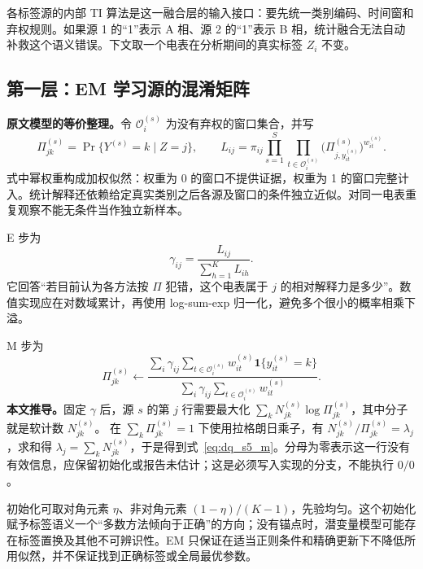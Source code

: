 \documentclass[UTF8,11pt,fontset=fandol,openany,oneside]{ctexbook}
\theoremstyle{definition}
\theoremstyle{remark}
\numberwithin{equation}{chapter}
\begin{document}
各标签源的内部 TI 算法是这一融合层的输入接口：要先统一类别编码、时间窗和弃权规则。如果源 1 的“1”表示 A 相、源 2 的“1”表示 B 相，统计融合无法自动补救这个语义错误。下文取一个电表在分析期间的真实标签 $Z_i$ 不变。

\subsection{第一层：EM 学习源的混淆矩阵}

\textbf{原文模型的等价整理。}令 $\mathcal O_i^{(s)}$ 为没有弃权的窗口集合，并写
\begin{equation}
 \Pi_{jk}^{(s)}=\Pr\{Y^{(s)}=k\mid Z=j\},\qquad
 L_{ij}=\pi_{ij}\prod_{s=1}^S\prod_{t\in\mathcal O_i^{(s)}}
       \bigl(\Pi_{j,y_{it}^{(s)}}^{(s)}\bigr)^{w_{it}^{(s)}}.
 \label{eq:dq_s5_likelihood}
\end{equation}
式中幂权重构成加权似然：权重为 0 的窗口不提供证据，权重为 1 的窗口完整计入。统计解释还依赖给定真实类别之后各源及窗口的条件独立近似。对同一电表重复观察不能无条件当作独立新样本。

E 步为
\begin{equation}
 \gamma_{ij}=\frac{L_{ij}}{\sum_{h=1}^K L_{ih}}.
 \label{eq:dq_s5_e}
\end{equation}
它回答“若目前认为各方法按 $\Pi$ 犯错，这个电表属于 $j$ 的相对解释力是多少”。数值实现应在对数域累计，再使用 log-sum-exp 归一化，避免多个很小的概率相乘下溢。

M 步为
\begin{equation}
 \Pi_{jk}^{(s)}\leftarrow
 \frac{\displaystyle\sum_i\gamma_{ij}
       \sum_{t\in\mathcal O_i^{(s)}}w_{it}^{(s)}\mathbf1\{y_{it}^{(s)}=k\}}
      {\displaystyle\sum_i\gamma_{ij}
       \sum_{t\in\mathcal O_i^{(s)}}w_{it}^{(s)}}.
 \label{eq:dq_s5_m}
\end{equation}
\textbf{本文推导。}固定 $\gamma$ 后，源 $s$ 的第 $j$ 行需要最大化
$\sum_k N_{jk}^{(s)}\log\Pi_{jk}^{(s)}$，其中分子就是软计数 $N_{jk}^{(s)}$。
在 $\sum_k\Pi_{jk}^{(s)}=1$ 下使用拉格朗日乘子，有
$N_{jk}^{(s)}/\Pi_{jk}^{(s)}=\lambda_j$，求和得 $\lambda_j=\sum_kN_{jk}^{(s)}$，于是得到式~\eqref{eq:dq_s5_m}。分母为零表示这一行没有有效信息，应保留初始化或报告未估计；这是必须写入实现的分支，不能执行 $0/0$。

初始化可取对角元素 $\eta$、非对角元素 $(1-\eta)/(K-1)$，先验均匀。这个初始化赋予标签语义一个“多数方法倾向于正确”的方向；没有锚点时，潜变量模型可能存在标签置换及其他不可辨识性。EM 只保证在适当正则条件和精确更新下不降低所用似然，并不保证找到正确标签或全局最优参数。
\end{document}
